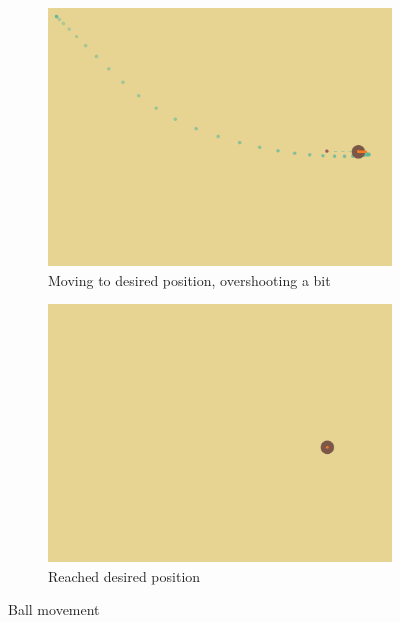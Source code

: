 \begin{figure}
	\begin{subfigure}[b]{0.80\linewidth}
		\includegraphics[trim = 0mm 110mm 0mm 0mm, clip, width=\linewidth]{figures/BallTracker-overshooting.png}
		\caption{Moving to desired position, overshooting a bit}
		\label{fig:balltracker-moving}
	\end{subfigure}
	
	\begin{subfigure}[b]{0.80\linewidth}
		\includegraphics[trim = 0mm 110mm 0mm 0mm, clip, width=\linewidth]{figures/BallTracker-desired.png}
		\caption{Reached desired position}
		\label{fig:balltracker-reached}
	\end{subfigure}
	\caption{Ball movement}
	\label{fig:balltracker}
\end{figure}

